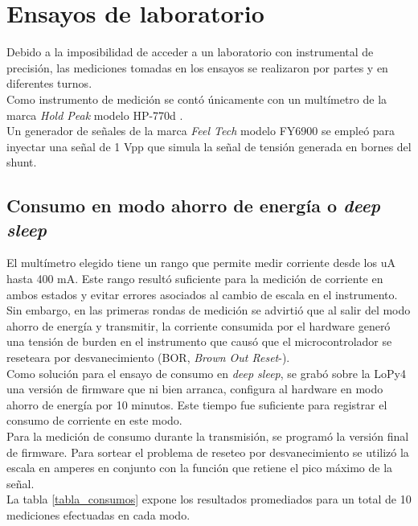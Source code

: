 \section{Ensayos de laboratorio}
Debido a la imposibilidad de acceder a un laboratorio con instrumental de precisión, las mediciones tomadas en los ensayos se realizaron por partes y en diferentes turnos.\\
Como instrumento de medición se contó únicamente con un multímetro de la marca \textit{Hold Peak} modelo HP-770d \citep{hp770d}.\\
Un generador de señales de la marca \textit{Feel Tech} modelo FY6900 se empleó para inyectar una señal de 1 Vpp que simula la señal de tensión generada en bornes del shunt.
\subsection{Consumo en modo ahorro de energía o \textit{deep sleep}}
El mult\'{i}metro elegido tiene un rango que permite medir corriente desde los uA hasta 400 mA. Este rango resultó suficiente para la medición de corriente en ambos estados y evitar errores asociados al cambio de escala en el instrumento. Sin embargo, en las primeras rondas de medición se advirtió que al salir del modo ahorro de energía y transmitir, la corriente consumida por el hardware generó una tensión de burden en el instrumento que causó que el microcontrolador se reseteara por desvanecimiento (BOR, \textit{Brown Out Reset}-).\\
Como solución para el ensayo de consumo en \textit{deep sleep}, se grabó sobre la LoPy4 una versión de firmware que ni bien arranca, configura al hardware en modo ahorro de energía por 10 minutos. Este tiempo fue suficiente para registrar el consumo de corriente en este modo.\\
Para la medición de consumo durante la transmisión, se programó la versión final de firmware. Para sortear el problema de reseteo por desvanecimiento se utilizó la escala en amperes en conjunto con la función que retiene el pico máximo de la señal.\\
La tabla \ref{tabla_consumos} expone los resultados promediados para un total de 10 mediciones efectuadas en cada modo.\\
